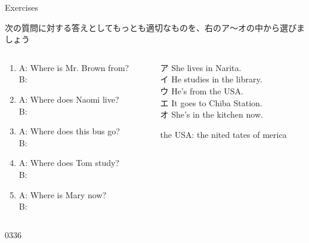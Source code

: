 \documentclass[aspectratio=169,xcolor={dvipsnames,table}]{beamer}
\begin{document}
\begin{frame}[plain]{Exercises}

 {\small 次の質問に対する答えとしてもっとも適切なものを、右のア～オの中から選びましょう}

\begin{columns}[t]
 \begin{column}{.475\textwidth}
\begin{enumerate}
 \item A: Where is Mr. Brown from?\\
B: 
 \item A: Where does Naomi live?\\
B: 
 \item A: Where does this bus go?\\
B: 
 \item A: Where does Tom study?\\
B: 
 \item A: Where is Mary now?\\
B: 
\end{enumerate}  
 \end{column}
\begin{column}{.475\textwidth}
\begin{tcolorbox}
ア She lives in Narita.\\
イ He studies in the library.\\
ウ He's from the USA.\\
エ It goes to Chiba Station.\\
オ She's in the kitchen now.
\end{tcolorbox} 

\hfill{\scriptsize the USA: the nited tates of merica}

\end{column}
\end{columns}

\mbox{}\hfill{\tiny 0336}\,{\scriptsize {}}

\end{frame}
\end{document}
